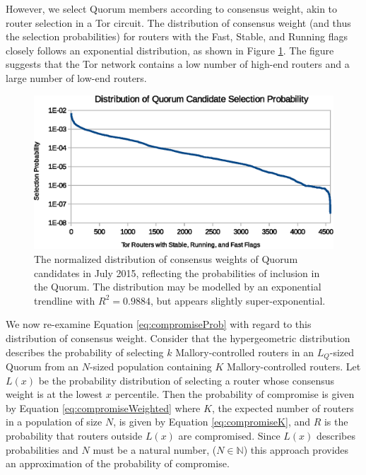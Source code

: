 \documentclass[USenglish,oneside,twocolumn]{article}
\begin{document}
However, we select Quorum members according to consensus weight, akin to router selection in a Tor circuit. The distribution of consensus weight (and thus the selection probabilities) for routers with the Fast, Stable, and Running flags closely follows an exponential distribution, as shown in Figure \ref{fig:weightDist}. The figure suggests that the Tor network contains a low number of high-end routers and a large number of low-end routers.

\begin{figure}[h]
	\centering
	\includegraphics[width=\linewidth]{../assets/analysis/QuorumCandidateWeights.eps}
	\caption{The normalized distribution of consensus weights of Quorum candidates in July 2015, reflecting the probabilities of inclusion in the Quorum. The distribution may be modelled by an exponential trendline with $ R^{2} = 0.9884 $, but appears slightly super-exponential.}
	\label{fig:weightDist}
\end{figure}

We now re-examine Equation \ref{eq:compromiseProb} with regard to this distribution of consensus weight. Consider that the hypergeometric distribution describes the probability of selecting $ k $ Mallory-controlled routers in an $ L_{Q} $-sized Quorum from an $ N $-sized population containing $ K $ Mallory-controlled routers. Let $ L(x) $ be the probability distribution of selecting a router whose consensus weight is at the lowest $ x $ percentile. Then the probability of compromise is given by Equation \ref{eq:compromiseWeighted} where $ K $, the expected number of routers in a population of size $ N $, is given by Equation \ref{eq:compromiseK}, and $ R $ is the probability that routers outside $ L(x) $ are compromised. Since $ L(x) $ describes probabilities and $ N $ must be a natural number, ($ N \in \mathbb{N} $) this approach provides an approximation of the probability of compromise.
\end{document}
